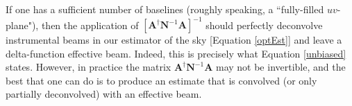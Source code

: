 \documentclass[twocolumn,apj,numberedappendix]{emulateapj}
\newcommand{\A}{\mathbf{A}}
\newcommand{\N}{\mathbf{N}}
\begin{document}
%
If one has a sufficient number of baselines (roughly speaking, a
``fully-filled $uv$-plane"), then the application of $ \left[ \A^\dagger
\N^{-1} \A \right]^{-1}$ should perfectly deconvolve instrumental beams in our
estimator of the sky [Equation \eqref{optEst}] and leave a delta-function
effective beam.  Indeed, this is precisely what Equation \eqref{unbiased}
states.  However, in practice the matrix $\A^\dagger \N^{-1} \A$ may not be
invertible, and the best that one can do is to produce an estimate that is
convolved (or only partially deconvolved) with an effective beam.
\end{document}
